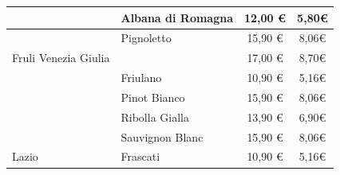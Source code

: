 \documentclass[12pt, a4paper]{article}
\begin{document}
\begin{longtable}{@{}|l|l|c|c|}
                         & Albana di Romagna                                                         & 12,00 €                                                         & 5,80€                                                                                                         \\ \hline
                         & Pignoletto                                                                & 15,90 €                                                         & 8,06€                                                                                                         \\ \hline
    Fruli Venezia Giulia &                                                                           & 17,00 €                                                         & 8,70€                                                                                                         \\ \hline
                         & Friulano                                                                  & 10,90 €                                                         & 5,16€                                                                                                         \\ \hline
                         & Pinot Bianco                                                              & 15,90 €                                                         & 8,06€                                                                                                         \\ \hline
                         & Ribolla Gialla                                                            & 13,90 €                                                         & 6,90€                                                                                                         \\ \hline
                         & Sauvignon Blanc                                                           & 15,90 €                                                         & 8,06€                                                                                                         \\ \hline
    Lazio                & Frascati                                                                  & 10,90 €                                                         & 5,16€                                                                                                         \\ \hline

\end{longtable}
\end{document}
